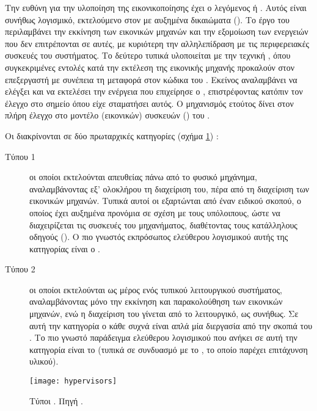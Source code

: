 Την ευθύνη για την υλοποίηση της εικονικοποίησης έχει ο λεγόμενος
 ή . Αυτός είναι συνήθως
λογισμικό, εκτελούμενο στον \host{} με αυξημένα δικαιώματα ().
Το έργο του περιλαμβάνει την εκκίνηση των εικονικών μηχανών και την
εξομοίωση των ενεργειών που δεν επιτρέπονται σε αυτές, με κυριότερη την
αλληλεπίδραση με τις περιφερειακές συσκευές του συστήματος. Το δεύτερο τυπικά
υλοποιείται με την τεχνική , όπου συγκεκριμένες εντολές
κατά την εκτέλεση της εικονικής μηχανής προκαλούν  στον επεξεργαστή
με συνέπεια τη μεταφορά στον κώδικα του . Εκείνος αναλαμβάνει
να ελέγξει και να εκτελέσει την ενέργεια που επιχείρησε ο \guest{},
επιστρέφοντας κατόπιν τον έλεγχο στο σημείο όπου είχε σταματήσει αυτός. Ο
μηχανισμός ετούτος δίνει στον  πλήρη έλεγχο στο μοντέλο
(εικονικών) συσκευών () του 
\cite{wiki:hypervisor}.

Οι  διακρίνονται σε δύο πρωταρχικές κατηγορίες (σχήμα
\ref{fig:hypervisors}) \cite{popek74}:
\begin{description}
    \item[Τύπου 1] οι οποίοι εκτελούνται απευθείας πάνω από το φυσικό μηχάνημα,
        αναλαμβάνοντας εξ' ολοκλήρου τη διαχείριση του, πέρα από τη διαχείριση
        των εικονικών μηχανών. Τυπικά αυτοί οι  εξαρτώνται από
        έναν \guest{} ειδικού σκοπού, ο οποίος έχει αυξημένα προνόμια σε
        σχέση με τους υπόλοιπους, ώστε να διαχειρίζεται τις συσκευές του
        μηχανήματος, διαθέτοντας τους κατάλληλους οδηγούς (). Ο πιο
        γνωστός εκπρόσωπος ελεύθερου λογισμικού αυτής της κατηγορίας είναι ο
         \cite{xen}.
    \item[Τύπου 2] οι οποίοι εκτελούνται ως μέρος ενός τυπικού λειτουργικού
        συστήματος, αναλαμβάνοντας μόνο την εκκίνηση και παρακολούθηση των
        εικονικών μηχανών, ενώ η διαχείριση του \host{} γίνεται από το
        λειτουργικό, ως συνήθως. Σε αυτή την κατηγορία ο κάθε \guest{} συχνά
        είναι απλά μία διεργασία από την σκοπιά του \host{}. Το πιο γνωστό
        παράδειγμα ελεύθερου λογισμικού που ανήκει σε αυτή την κατηγορία είναι
        το \qemu{} \cite{qemu} (τυπικά σε συνδυασμό με το  \cite{kvm},
        το οποίο παρέχει επιτάχυνση υλικού).
\end{description}

\begin{figure}
    \centering
    \texttt{[image: hypervisors]}
    \caption[Τύποι ]{Τύποι . Πηγή
        .}
    \label{fig:hypervisors}
\end{figure}

